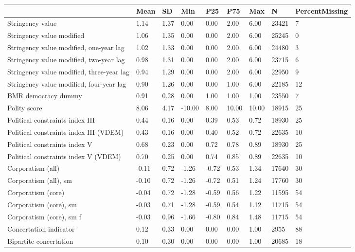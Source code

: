 
\begin{longtable}{lllllllll}
\toprule
  & Mean & SD & Min & P25 & P75 & Max & N & PercentMissing\\
\midrule
Stringency value & 1.14 & 1.37 & 0.00 & 0.00 & 2.00 & 6.00 & 23421 & 7\\
Stringency value modified & 1.06 & 1.35 & 0.00 & 0.00 & 2.00 & 6.00 & 25245 & 0\\
Stringency value modified, one-year lag & 1.02 & 1.33 & 0.00 & 0.00 & 2.00 & 6.00 & 24480 & 3\\
Stringency value modified, two-year lag & 0.98 & 1.31 & 0.00 & 0.00 & 2.00 & 6.00 & 23715 & 6\\
Stringency value modified, three-year lag & 0.94 & 1.29 & 0.00 & 0.00 & 2.00 & 6.00 & 22950 & 9\\
\addlinespace
Stringency value modified, four-year lag & 0.90 & 1.26 & 0.00 & 0.00 & 1.00 & 6.00 & 22185 & 12\\
BMR democracy dummy & 0.91 & 0.28 & 0.00 & 1.00 & 1.00 & 1.00 & 23550 & 7\\
Polity score & 8.06 & 4.17 & -10.00 & 8.00 & 10.00 & 10.00 & 18915 & 25\\
Political constraints index III & 0.44 & 0.16 & 0.00 & 0.39 & 0.53 & 0.72 & 18930 & 25\\
Political constraints index III (VDEM) & 0.43 & 0.16 & 0.00 & 0.40 & 0.52 & 0.72 & 22635 & 10\\
\addlinespace
Political constraints index V & 0.68 & 0.23 & 0.00 & 0.72 & 0.78 & 0.89 & 18930 & 25\\
Political constraints index V (VDEM) & 0.70 & 0.25 & 0.00 & 0.74 & 0.85 & 0.89 & 22635 & 10\\
Corporatism (all) & -0.11 & 0.72 & -1.26 & -0.72 & 0.53 & 1.34 & 17640 & 30\\
Corporatism (all), sm & -0.10 & 0.72 & -1.26 & -0.72 & 0.51 & 1.24 & 17760 & 30\\
Corporatism (core) & -0.04 & 0.72 & -1.28 & -0.59 & 0.56 & 1.22 & 11595 & 54\\
\addlinespace
Corporatism (core), sm & -0.03 & 0.71 & -1.28 & -0.59 & 0.54 & 1.12 & 11715 & 54\\
Corporatism (core), sm f & -0.03 & 0.96 & -1.66 & -0.80 & 0.84 & 1.48 & 11715 & 54\\
Concertation indicator & 0.12 & 0.33 & 0.00 & 0.00 & 0.00 & 1.00 & 2955 & 88\\
Bipartite concertation & 0.10 & 0.30 & 0.00 & 0.00 & 0.00 & 1.00 & 20685 & 18\\

\end{longtable}

